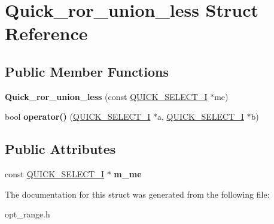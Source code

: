 \hypertarget{structQuick__ror__union__less}{}\section{Quick\+\_\+ror\+\_\+union\+\_\+less Struct Reference}
\label{structQuick__ror__union__less}
\subsection*{Public Member Functions}
\begin{DoxyCompactItemize}
\item 
\mbox{\label{structQuick__ror__union__less_aa5b3f2d4d9213fe43211c575015d1ef9}} 
{\bfseries Quick\+\_\+ror\+\_\+union\+\_\+less} (const \mbox{\hyperlink{classQUICK__SELECT__I}{Q\+U\+I\+C\+K\+\_\+\+S\+E\+L\+E\+C\+T\+\_\+I}} $\ast$me)
\item 
\mbox{\label{structQuick__ror__union__less_a7bdb5569e720fb2945c27e84b8b5967a}} 
bool {\bfseries operator()} (\mbox{\hyperlink{classQUICK__SELECT__I}{Q\+U\+I\+C\+K\+\_\+\+S\+E\+L\+E\+C\+T\+\_\+I}} $\ast$a, \mbox{\hyperlink{classQUICK__SELECT__I}{Q\+U\+I\+C\+K\+\_\+\+S\+E\+L\+E\+C\+T\+\_\+I}} $\ast$b)
\end{DoxyCompactItemize}
\subsection*{Public Attributes}
\begin{DoxyCompactItemize}
\item 
\mbox{\label{structQuick__ror__union__less_afa9608351e08d9e5971fd5bfc84a671a}} 
const \mbox{\hyperlink{classQUICK__SELECT__I}{Q\+U\+I\+C\+K\+\_\+\+S\+E\+L\+E\+C\+T\+\_\+I}} $\ast$ {\bfseries m\+\_\+me}
\end{DoxyCompactItemize}


The documentation for this struct was generated from the following file\+:\begin{DoxyCompactItemize}
\item 
opt\+\_\+range.\+h\end{DoxyCompactItemize}
